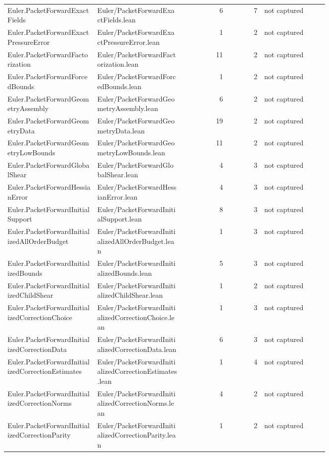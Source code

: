 \documentclass[10pt]{article}
\begin{document}
\begin{longtable}{p{0.28\linewidth}p{0.27\linewidth}r r p{0.20\linewidth}}
Euler.PacketForwardExactFields & Euler/PacketForwardExactFields.lean & 6 & 7 & not captured\\
Euler.PacketForwardExactPressureError & Euler/PacketForwardExactPressureError.lean & 1 & 2 & not captured\\
Euler.PacketForwardFactorization & Euler/PacketForwardFactorization.lean & 11 & 2 & not captured\\
Euler.PacketForwardForcedBounds & Euler/PacketForwardForcedBounds.lean & 1 & 2 & not captured\\
Euler.PacketForwardGeometryAssembly & Euler/PacketForwardGeometryAssembly.lean & 6 & 2 & not captured\\
Euler.PacketForwardGeometryData & Euler/PacketForwardGeometryData.lean & 19 & 2 & not captured\\
Euler.PacketForwardGeometryLowBounds & Euler/PacketForwardGeometryLowBounds.lean & 11 & 2 & not captured\\
Euler.PacketForwardGlobalShear & Euler/PacketForwardGlobalShear.lean & 4 & 3 & not captured\\
Euler.PacketForwardHessianError & Euler/PacketForwardHessianError.lean & 4 & 3 & not captured\\
Euler.PacketForwardInitialSupport & Euler/PacketForwardInitialSupport.lean & 8 & 3 & not captured\\
Euler.PacketForwardInitializedAllOrderBudget & Euler/PacketForwardInitializedAllOrderBudget.lean & 1 & 3 & not captured\\
Euler.PacketForwardInitializedBounds & Euler/PacketForwardInitializedBounds.lean & 5 & 3 & not captured\\
Euler.PacketForwardInitializedChildShear & Euler/PacketForwardInitializedChildShear.lean & 1 & 2 & not captured\\
Euler.PacketForwardInitializedCorrectionChoice & Euler/PacketForwardInitializedCorrectionChoice.lean & 1 & 3 & not captured\\
Euler.PacketForwardInitializedCorrectionData & Euler/PacketForwardInitializedCorrectionData.lean & 6 & 3 & not captured\\
Euler.PacketForwardInitializedCorrectionEstimates & Euler/PacketForwardInitializedCorrectionEstimates.lean & 1 & 4 & not captured\\
Euler.PacketForwardInitializedCorrectionNorms & Euler/PacketForwardInitializedCorrectionNorms.lean & 4 & 2 & not captured\\
Euler.PacketForwardInitializedCorrectionParity & Euler/PacketForwardInitializedCorrectionParity.lean & 1 & 2 & not captured\\

\end{longtable}
\end{document}
